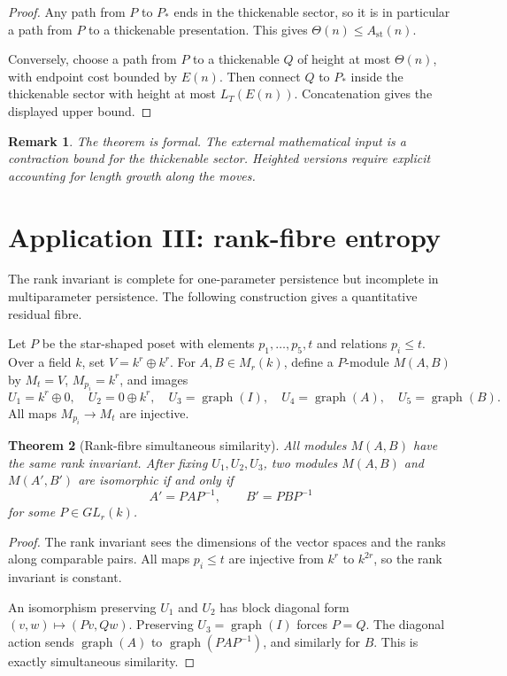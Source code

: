 \documentclass[11pt]{article}
\newtheorem{theorem}{Theorem}[section]
\newtheorem{remark}[theorem]{Remark}
\begin{document}
\begin{proof}
Any path from \(P\) to \(P_*\) ends in the thickenable sector, so it is in particular a path from \(P\) to a thickenable presentation.  This gives \(\Theta(n)\le A_{\mathrm{st}}(n)\).

Conversely, choose a path from \(P\) to a thickenable \(Q\) of height at most \(\Theta(n)\), with endpoint cost bounded by \(E(n)\).  Then connect \(Q\) to \(P_*\) inside the thickenable sector with height at most \(L_T(E(n))\).  Concatenation gives the displayed upper bound.
\end{proof}

\begin{remark}
The theorem is formal.  The external mathematical input is a contraction bound for the thickenable sector.  Heighted versions require explicit accounting for length growth along the moves.
\end{remark}

\section{Application III: rank-fibre entropy}

The rank invariant is complete for one-parameter persistence but incomplete in multiparameter persistence.  The following construction gives a quantitative residual fibre.

Let \(P\) be the star-shaped poset with elements \(p_1,\ldots,p_5,t\) and relations \(p_i\le t\).  Over a field \(k\), set \(V=k^r\oplus k^r\).  For \(A,B\in M_r(k)\), define a \(P\)-module \(M(A,B)\) by \(M_t=V\), \(M_{p_i}=k^r\), and images
\[
U_1=k^r\oplus0,\quad
U_2=0\oplus k^r,\quad
U_3=\operatorname{graph}(I),\quad
U_4=\operatorname{graph}(A),\quad
U_5=\operatorname{graph}(B).
\]
All maps \(M_{p_i}\to M_t\) are injective.

\begin{theorem}[Rank-fibre simultaneous similarity]
All modules \(M(A,B)\) have the same rank invariant.  After fixing \(U_1,U_2,U_3\), two modules \(M(A,B)\) and \(M(A',B')\) are isomorphic if and only if
\[
A'=PAP^{-1},\qquad B'=PBP^{-1}
\]
for some \(P\in GL_r(k)\).
\end{theorem}

\begin{proof}
The rank invariant sees the dimensions of the vector spaces and the ranks along comparable pairs.  All maps \(p_i\le t\) are injective from \(k^r\) to \(k^{2r}\), so the rank invariant is constant.

An isomorphism preserving \(U_1\) and \(U_2\) has block diagonal form \((v,w)\mapsto(Pv,Qw)\).  Preserving \(U_3=\operatorname{graph}(I)\) forces \(P=Q\).  The diagonal action sends \(\operatorname{graph}(A)\) to \(\operatorname{graph}(PAP^{-1})\), and similarly for \(B\).  This is exactly simultaneous similarity.
\end{proof}
\end{document}
